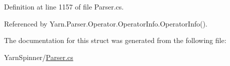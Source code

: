 Definition at line 1157 of file Parser.\-cs.



Referenced by Yarn.\-Parser.\-Operator.\-Operator\-Info.\-Operator\-Info().



The documentation for this struct was generated from the following file\-:\begin{DoxyCompactItemize}
\item 
Yarn\-Spinner/\hyperlink{a00316}{Parser.\-cs}\end{DoxyCompactItemize}
